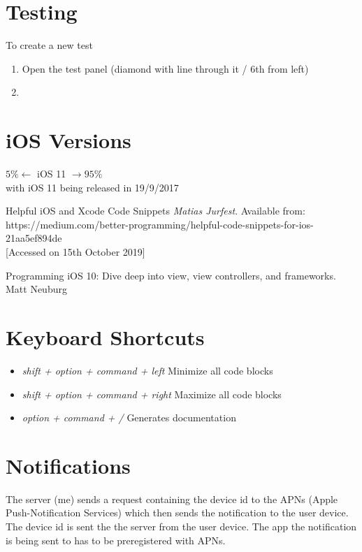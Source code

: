 \documentclass[]{article}
\newcommand{\<}{\guilsinglleft}
\renewcommand{\>}{\guilsinglright}
\renewcommand{\it}[1]{\textit{#1}}
\begin{document}
\section{Testing}
To create a new test
\begin{enumerate}
	\item Open the test panel (diamond with line through it / 6th from left)
	\item 
\end{enumerate}


\section{iOS Versions}
$5\% \leftarrow$  iOS 11 $\rightarrow 95\%$
\\
with iOS 11 being released in 19/9/2017

\begin{thebibliography}{99}
	
	Helpful iOS and Xcode Code Snippets
	\it{Matias Jurfest}.
	Available from:
	\<https://medium.com/better-programming/helpful-code-snippets-for-ios-21aa5ef894de\>
	\\{[Accessed on 15th October 2019]}
	
	Programming iOS 10: Dive deep into view, view controllers, and frameworks.
	Matt Neuburg

\end{thebibliography}

\section{Keyboard Shortcuts}
\begin{itemize}
	\item \it{shift + option + command + left}
	\subitem Minimize all code blocks
	
	\item \it{shift + option + command + right}
	\subitem Maximize all code blocks
	
	\item \it{option + command + /}
	\subitem Generates documentation 
\end{itemize}

\section{Notifications}
The server (me) sends a request containing the device id to the APNs (Apple Push-Notification Services) which then sends the notification to the user device.  The device id is sent the the server from the user device.  The app the notification is being sent to has to be preregistered with APNs.
\end{document}
